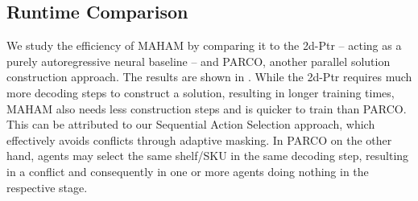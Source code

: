 \subsection{Runtime Comparison}
We study the efficiency of MAHAM by comparing it to the 2d-Ptr -- acting as a purely autoregressive neural baseline -- and PARCO, another parallel solution construction approach. The results are shown in . While the 2d-Ptr requires much more decoding steps to construct a solution, resulting in longer training times, MAHAM also needs less construction steps and is quicker to train than PARCO. This can be attributed to our Sequential Action Selection approach, which effectively avoids conflicts through adaptive masking. In PARCO on the other hand, agents may select the same shelf/SKU in the same decoding step, resulting in a conflict and consequently in one or more agents doing nothing in the respective stage. 